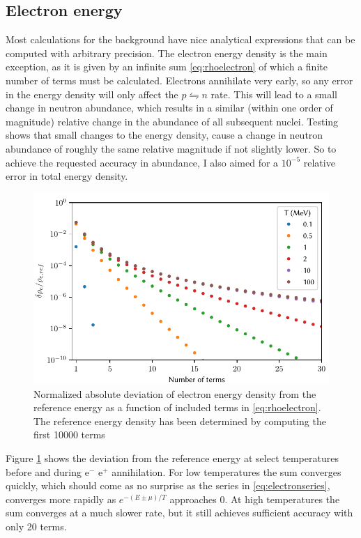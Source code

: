 \subsection{Electron energy}
Most calculations for the background have nice analytical expressions that can be computed with arbitrary precision. The electron energy density is the main exception, as it is given by an infinite sum \eqref{eq:rhoelectron} of which a finite number of terms must be calculated. Electrons annihilate very early, so any error in the energy density will only affect the $p\leftrightharpoons n$ rate. This will lead to a small change in neutron abundance, which results in a similar (within one order of magnitude) relative change in the abundance of all subsequent nuclei. 
Testing shows that small changes to the energy density, cause a change in neutron abundance of roughly the same relative magnitude if not slightly lower. So to achieve the requested accuracy in abundance, I also aimed for a $10^{-5}$ relative error in total energy density. 
\begin{figure}[ht!]
    \includegraphics[width=5.1in]{figures/Besselaccuracy.pdf}
    \caption{Normalized absolute deviation of electron energy density from the reference energy as a function of included terms in \eqref{eq:rhoelectron}. The reference energy density has been determined by computing the first 10000 terms}
    \label{fig:Besselaccuracy}
\end{figure}

Figure \ref{fig:Besselaccuracy} shows the deviation from the reference energy at select temperatures before and during e$^-$ e$^+$ annihilation. For low temperatures the sum converges quickly, which should come as no surprise as the series in \eqref{eq:electronseries}, converges more rapidly as $e^{-(E\pm\mu)/T}$ approaches 0. At high temperatures the sum converges at a much slower rate, but it still achieves sufficient accuracy with only 20 terms.

